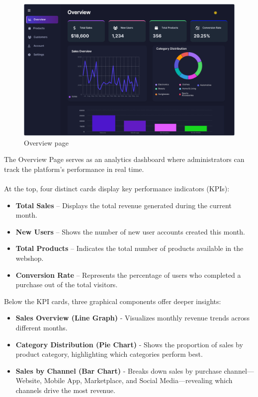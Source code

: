 \documentclass[11pt,a4paper]{article}
\begin{document}
	
	\begin{figure}[h]
		\centering
		\includegraphics[width=1\textwidth]{pictures/admin/Overview_Admin}
		\caption{Overview page}\label{fig:figure1}
	\end{figure}
	\vspace{0.3cm}
	The Overview Page serves as an analytics dashboard where administrators can track the platform’s performance in real time. \\ \\
	At the top, four distinct cards display key performance indicators (KPIs):
	\begin{itemize}
		\item \textbf{Total Sales} – Displays the total revenue generated during the current month.
		\item \textbf{New Users} – Shows the number of new user accounts created this month.
		\item \textbf{Total Products} – Indicates the total number of products available in the webshop.
		\item \textbf{Conversion Rate} – Represents the percentage of users who completed a purchase out of the total visitors.
	\end{itemize}
	Below the KPI cards, three graphical components offer deeper insights:
	\begin{itemize}
		\item \textbf{Sales Overview (Line Graph)} - Visualizes monthly revenue trends across different months.
		\item \textbf{Category Distribution (Pie Chart)} - Shows the proportion of sales by product category, highlighting which categories perform best.
		\item \textbf{Sales by Channel (Bar Chart)} - Breaks down sales by purchase channel—Website, Mobile App, Marketplace, and Social Media—revealing which channels drive the most revenue.
	\end{itemize}
	
\end{document}
